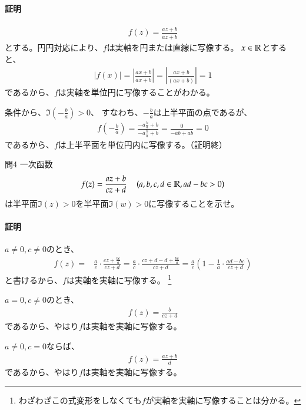 \paragraph{証明}
\begin{align*}
    f(z)=\frac{az+b}{\overline{a}z+\overline{b}}
\end{align*}
とする。円円対応により、$f$は実軸を円または直線に写像する。
$x\in\mathbb{R}$とすると、
\begin{align*}
    \left|f(x)\right|
    =\left|\frac{ax+b}{\overline{a}x+\overline{b}}\right|
    =\left|\frac{ax+b}{\overline{(ax+b)}}\right|
    =1
\end{align*}
であるから、$f$は実軸を単位円に写像することがわかる。

条件から、$\Im\left(-\frac{b}{a}\right)>0$、
すなわち、$-\frac{b}{a}$は上半平面の点であるが、
\begin{align*}
    f\left(-\frac{b}{a}\right)
    =\frac{-a\frac{b}{a}+b}{-\overline{a}\frac{b}{a}+\overline{b}}
    =\frac{0}{-\overline{a}b+a\overline{b}}
    =0
\end{align*}
であるから、$f$は上半平面を単位円内に写像する。（証明終）

\newpage
\begin{mysimplebox}{問4}
    一次函数
    \begin{align*}
        f(z)=\frac{az+b}{cz+d}
        \quad\left(a,b,c,d\in\mathbb{R},ad-bc>0\right)
    \end{align*}
    は半平面$\Im(z)>0$を半平面$\Im(w)>0$に写像することを示せ。
\end{mysimplebox}
\paragraph{証明}
$a\neq0,c\neq0$のとき、
\begin{align*}
    f(z)=&\frac{a}{c}\cdot\frac{cz+\frac{bc}{a}}{cz+d}
    =\frac{a}{c}\cdot\frac{cz+d-d+\frac{bc}{a}}{cz+d}
    =\frac{a}{c}\left(1-\frac{1}{a}\cdot\frac{ad-bc}{cz+d}\right)
\end{align*}
と書けるから、$f$は実軸を実軸に写像する。
\footnote{わざわざこの式変形をしなくても$f$が実軸を実軸に写像することは分かる。}

$a=0,c\neq0$のとき、
\begin{align*}
    f(z)=\frac{b}{cz+d}
\end{align*}
であるから、やはり$f$は実軸を実軸に写像する。

$a\neq0,c=0$ならば、
\begin{align*}
    f(z)=\frac{az+b}{d}
\end{align*}
であるから、やはり$f$は実軸を実軸に写像する。

